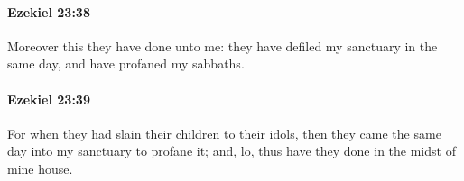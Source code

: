 		\paragraph{Ezekiel 23:38} %
			\label{EZEKIEL-23-38}

			Moreover this they have done unto me: they have defiled my sanctuary in the same day, and have profaned my sabbaths.


		\paragraph{Ezekiel 23:39} %
			\label{EZEKIEL-23-39}

			For when they had slain their children to their idols, then they came the same day into my sanctuary to profane it; and, lo, thus have they done in the midst of mine house.


